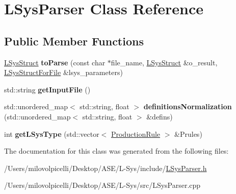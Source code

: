 \hypertarget{class_l_sys_parser}{}\section{L\+Sys\+Parser Class Reference}
\label{class_l_sys_parser}
\subsection*{Public Member Functions}
\begin{DoxyCompactItemize}
\item 
\mbox{\label{class_l_sys_parser_aa5b240bf8057b4e75c848d45db7b5b15}} 
\hyperlink{struct_l_sys_struct}{L\+Sys\+Struct} {\bfseries to\+Parse} (const char $\ast$file\+\_\+name, \hyperlink{struct_l_sys_struct}{L\+Sys\+Struct} \&o\+\_\+result, \hyperlink{struct_l_sys_struct_for_file}{L\+Sys\+Struct\+For\+File} \&lsys\+\_\+parameters)
\item 
\mbox{\label{class_l_sys_parser_af2aed9d825eaf67e06b5eccae46dd1c4}} 
std\+::string {\bfseries get\+Input\+File} ()
\item 
\mbox{\label{class_l_sys_parser_a18637c2b1ca3e9d9ab61adef8e03e363}} 
std\+::unordered\+\_\+map$<$ std\+::string, float $>$ {\bfseries definitions\+Normalization} (std\+::unordered\+\_\+map$<$ std\+::string, float $>$ \&defins)
\item 
\mbox{\label{class_l_sys_parser_a821b41074c77e8fec4ee7a244a85d7ef}} 
int {\bfseries get\+L\+Sys\+Type} (std\+::vector$<$ \hyperlink{struct_production_rule}{Production\+Rule} $>$ \&Prules)
\end{DoxyCompactItemize}


The documentation for this class was generated from the following files\+:\begin{DoxyCompactItemize}
\item 
/\+Users/milovolpicelli/\+Desktop/\+A\+S\+E/\+L-\/\+Sys/include/\hyperlink{_l_sys_parser_8h}{L\+Sys\+Parser.\+h}\item 
/\+Users/milovolpicelli/\+Desktop/\+A\+S\+E/\+L-\/\+Sys/src/L\+Sys\+Parser.\+cpp\end{DoxyCompactItemize}
